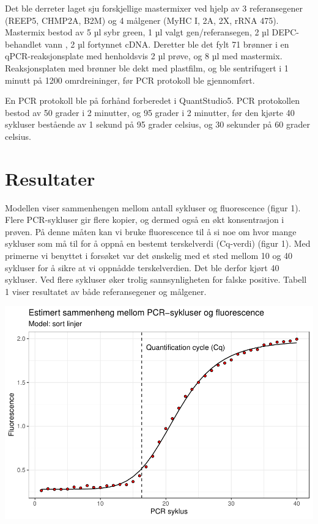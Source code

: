 \documentclass[
]{book}
\begin{document}
Det ble derreter laget sju forskjellige mastermixer ved hjelp av 3 referansegener (REEP5, CHMP2A, B2M) og 4 målgener (MyHC I, 2A, 2X, rRNA 475). Mastermix bestod av 5 µl sybr green, 1 µl valgt gen/referansegen, 2 µl DEPC-behandlet vann , 2 µl fortynnet cDNA. Deretter ble det fylt 71 brønner i en qPCR-reaksjonsplate med henholdsvis 2 µl prøve, og 8 µl med mastermix. Reaksjonsplaten med brønner ble dekt med plastfilm, og ble sentrifugert i 1 minutt på 1200 omrdreininger, før PCR protokoll ble gjennomført.

En PCR protokoll ble på forhånd forberedet i QuantStudio5. PCR protokollen bestod av 50 grader i 2 minutter, og 95 grader i 2 minutter, før den kjørte 40 sykluser bestående av 1 sekund på 95 grader celsius, og 30 sekunder på 60 grader celsius.

\hypertarget{resultater-1}{%
\section{Resultater}\label{resultater-1}}

Modellen viser sammenhengen mellom antall sykluser og fluorescence (figur 1). Flere PCR-sykluser gir flere kopier, og dermed også en økt konsentrasjon i prøven. På denne måten kan vi bruke fluorescence til å si noe om hvor mange sykluser som må til for å oppnå en bestemt terskelverdi (Cq-verdi) (figur 1). Med primerne vi benyttet i forsøket var det ønskelig med et sted mellom 10 og 40 sykluser for å sikre at vi oppnådde terskelverdien. Det ble derfor kjørt 40 sykluser. Ved flere sykluser øker trolig sannsynligheten for falske positive. Tabell 1 viser resultatet av både referansegener og målgener.

\includegraphics{_main_files/figure-latex/unnamed-chunk-3-1.pdf}
\end{document}
